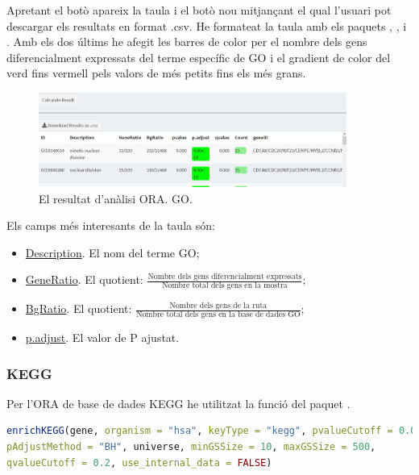 \documentclass[]{article}
\begin{document}
Apretant el botò apareix la taula i el botò nou mitjançant el qual l'usuari pot descargar els resultats en format .csv. He formateat la taula amb els paquets , ,   i . Amb els dos últims he afegit les barres de color per el nombre dels gens diferencialment expressats del terme específic de GO i el gradient de color del verd fins vermell pels valors de més petits fins els més grans. 

\begin{figure}[h!]
\centering
\includegraphics[width=0.9\textwidth]{App_F6_Items_GO_ORA_Table.png}  
\caption{El resultat d'anàlisi ORA. GO.}
\end{figure}

Els camps més interesants de la taula són:

\begin{itemize}
\item \underline{Description}. El nom del terme GO;
\item \underline{GeneRatio}. El quotient: $\displaystyle\frac{\mbox{Nombre dels gens diferencialment expressats}}{\mbox{Nombre total dels gens en la mostra}}$; 
\item \underline{BgRatio}. El quotient: $\displaystyle\frac{\mbox{Nombre dels gens de la ruta}}{\mbox{Nombre total dels gens en la base de dades GO}}$;
\item \underline{p.adjust}. El valor de P ajustat.
\end{itemize}

\subsubsection{KEGG}

Per l'ORA de base de dades KEGG he utilitzat la funció  del paquet .  

\begin{lstlisting}[language=R]
enrichKEGG(gene, organism = "hsa", keyType = "kegg", pvalueCutoff = 0.05, 
pAdjustMethod = "BH", universe, minGSSize = 10, maxGSSize = 500, 
qvalueCutoff = 0.2, use_internal_data = FALSE)
\end{lstlisting}
\end{document}
